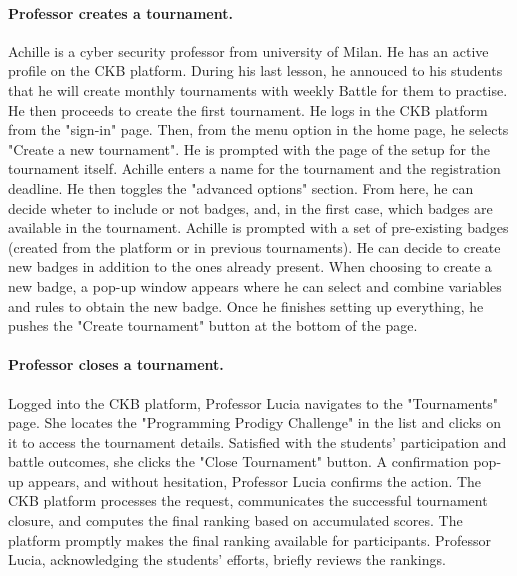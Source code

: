 \paragraph{Professor creates a tournament. }
Achille is a cyber security professor from university of Milan. He has an active profile on the CKB platform. 
During his last lesson, he annouced to his students that he will create monthly tournaments with weekly Battle for them to practise. 
He then proceeds to create the first tournament. He logs in the CKB platform from the "sign-in" page. 
Then, from the menu option in the home page, he selects "Create a new tournament". He is prompted with the page of the setup for the tournament itself. 
Achille enters a name for the tournament and the registration deadline. He then toggles the "advanced options" section. 
From here, he can decide wheter to include or not badges, and, in the first case, which badges are available in the tournament. 
Achille is prompted with a set of pre-existing badges (created from the platform or in previous tournaments). He can decide to 
create new badges in addition to the ones already present. When choosing to create a new badge, a pop-up window appears where he can select and combine 
variables and rules to obtain the new badge. Once he finishes setting up everything, he pushes the "Create tournament" button at the bottom of the page. 

\paragraph*{Professor closes a tournament.}
Logged into the CKB platform, Professor Lucia navigates to the "Tournaments" page. She locates the "Programming Prodigy Challenge" in the list and clicks
on it to access the tournament details. Satisfied with the students' participation and battle outcomes, she clicks the "Close Tournament" button.
A confirmation pop-up appears, and without hesitation, Professor Lucia confirms the action. The CKB platform processes the request, communicates 
the successful tournament closure, and computes the final ranking based on accumulated scores.
The platform promptly makes the final ranking available for participants. Professor Lucia, acknowledging the students' efforts, briefly reviews the rankings. 

